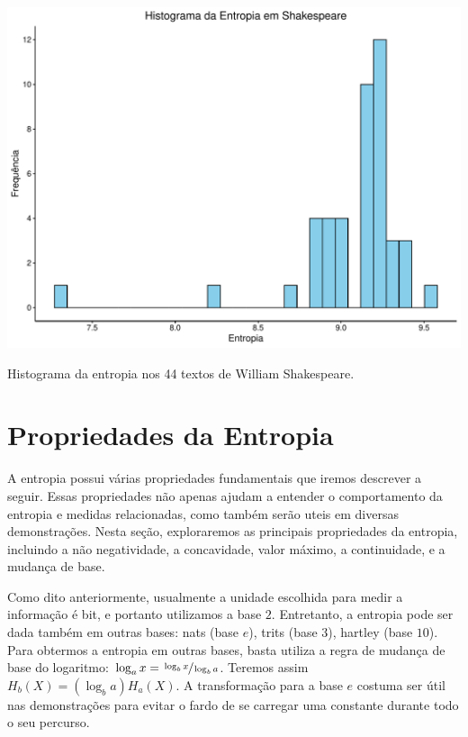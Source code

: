\begin{marginfigure}%
    \includegraphics[width=\linewidth]{figures/zipf_entropy_shalespeare.pdf}
    \caption{Histograma da entropia nos 44 textos de William Shakespeare.}
  \label{fig:zipfshakespeareentropy}
\end{marginfigure}









\section{Propriedades da Entropia}\label{sec:entropyprop}

A entropia possui várias propriedades fundamentais que iremos descrever a
seguir. Essas propriedades não apenas ajudam a entender o comportamento da
entropia e medidas relacionadas, como também serão uteis em diversas
demonstrações. Nesta seção, exploraremos as principais propriedades da
entropia, incluindo a não negatividade, a concavidade, valor máximo, a
continuidade, e a mudança de base.

Como dito anteriormente, usualmente a unidade escolhida para medir a informação
é bit, e portanto utilizamos a base $2$. Entretanto, a entropia pode ser dada
também em outras bases: nats (base $e$), trits (base $3$), hartley (base $10$).
Para obtermos a entropia em outras bases, basta utiliza a regra de mudança de
base do logaritmo: $\log_{a} x = \sfrac{\log_{b} x}{\log_{b} a}$. Teremos
assim $H_b(X) = (\log_b a) H_a(X)$. A transformação para a base $e$ costuma ser
útil nas demonstrações para evitar o fardo de se carregar uma constante durante
todo o seu percurso.

